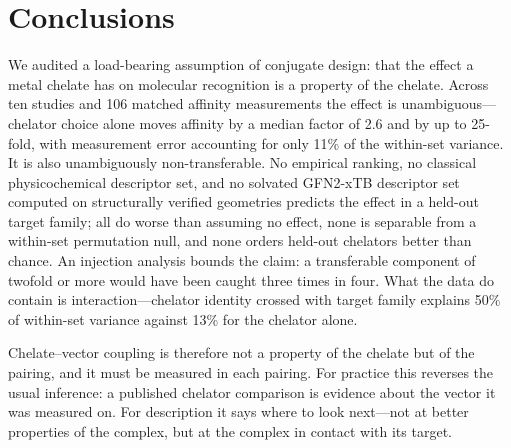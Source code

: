 \section{Conclusions}

We audited a load-bearing assumption of conjugate design: that the effect a metal chelate has on molecular recognition is a property of the chelate. Across ten studies and 106 matched affinity measurements the effect is unambiguous---chelator choice alone moves affinity by a median factor of 2.6 and by up to 25-fold, with measurement error accounting for only 11\% of the within-set variance. It is also unambiguously non-transferable. No empirical ranking, no classical physicochemical descriptor set, and no solvated GFN2-xTB descriptor set computed on structurally verified geometries predicts the effect in a held-out target family; all do worse than assuming no effect, none is separable from a within-set permutation null, and none orders held-out chelators better than chance. An injection analysis bounds the claim: a transferable component of twofold or more would have been caught three times in four. What the data do contain is interaction---chelator identity crossed with target family explains 50\% of within-set variance against 13\% for the chelator alone.

Chelate--vector coupling is therefore not a property of the chelate but of the pairing, and it must be measured in each pairing. For practice this reverses the usual inference: a published chelator comparison is evidence about the vector it was measured on. For description it says where to look next---not at better properties of the complex, but at the complex in contact with its target.
